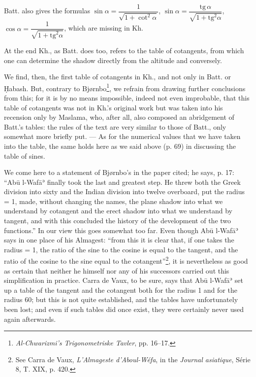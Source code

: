 \documentclass[11pt]{article}
\newcommand{\Pg}[1]{\marginpar{\footnotesize\color{gray}#1}}
\begin{document}
\par Batt. also gives the formulas $\sin\alpha = \dfrac{1}{\sqrt{1+\cot^{2}\alpha}}$, $\sin\alpha = \dfrac{\mathrm{tg}\,\alpha}{\sqrt{1+\mathrm{tg}^{2}\alpha}}$, $\cos\alpha = \dfrac{1}{\sqrt{1+\mathrm{tg}^{2}\alpha}}$, which are missing in Kh.\par
\par At the end Kh., as Batt. does too, refers to the table of cotangents, from which one can determine the shadow directly from the altitude and conversely.\par
\par We find, then, the first table of cotangents in Kh., and not only in Batt. or Ḥabash. But, contrary to Bjørnbo\footnote{\emph{Al-Chwarizmi’s Trigonometriske Tavler}, pp. 16–17.}, we refrain from drawing further conclusions from this; for it is by no means impossible, indeed not even improbable, that this table of cotangents was not in Kh.'s original work but was taken into his recension only by Maslama, who, after all, also composed an abridgement of Batt.'s tables: the rules of the text are very similar to those of Batt., only somewhat more briefly put. — As for the numerical values that we have taken into the table, the same holds here as we said above (p. 69) in discussing the table of sines.\par
\par \Pg{78}We come here to a statement of Bjørnbo's in the paper cited; he says, p. 17: “Abū l-Wafāʾ finally took the last and greatest step. He threw both the Greek division into sixty and the Indian division into twelve overboard, put the radius = 1, made, without changing the names, the plane shadow into what we understand by cotangent and the erect shadow into what we understand by tangent, and with this concluded the history of the development of the two functions.” In our view this goes somewhat too far. Even though Abū l-Wafāʾ says in one place of his Almagest: “from this it is clear that, if one takes the radius = 1, the ratio of the sine to the cosine is equal to the tangent, and the ratio of the cosine to the sine equal to the cotangent”\footnote{See Carra de Vaux, \emph{L’Almageste d’Aboul-Wéfa}, in the \emph{Journal asiatique}, Série 8, T. XIX, p. 420.}, it is nevertheless as good as certain that neither he himself nor any of his successors carried out this simplification in practice. Carra de Vaux, to be sure, says that Abū l-Wafāʾ set up a table of the tangent and the cotangent both for the radius 1 and for the radius 60; but this is not quite established, and the tables have unfortunately been lost; and even if such tables did once exist, they were certainly never used again afterwards.\par
\end{document}
